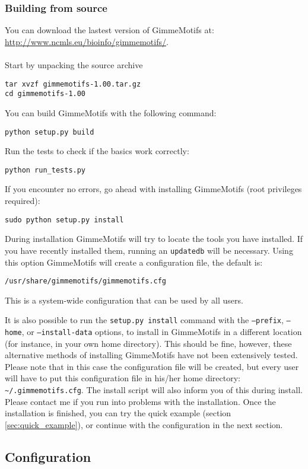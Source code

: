 \documentclass[11pt]{article}
\begin{document}
\subsubsection{Building from source}
You can download the lastest version of GimmeMotifs at:\\
\url{http://www.ncmls.eu/bioinfo/gimmemotifs/}. \\
\\
Start by unpacking the source archive
\begin{verbatim}
tar xvzf gimmemotifs-1.00.tar.gz
cd gimmemotifs-1.00
\end{verbatim}
You can build GimmeMotifs with the following command:
\begin{verbatim}
python setup.py build
\end{verbatim}
Run the tests to check if the basics work correctly:
\begin{verbatim}
python run_tests.py
\end{verbatim}
If you encounter no errors, go ahead with installing GimmeMotifs (root privileges required):
\begin{verbatim}
sudo python setup.py install
\end{verbatim}
During installation GimmeMotifs will try to locate the tools you have installed. If you have recently installed them, running an \texttt{updatedb} will be necessary. Using this option GimmeMotifs will create a configuration file, the default is:
\begin{verbatim}
/usr/share/gimmemotifs/gimmemotifs.cfg
\end{verbatim}
This is a system-wide configuration that can be used by all users.

It is also possible to run the \texttt{setup.py install} command with the \texttt{--prefix}, \texttt{--home}, or \texttt{--install-data} options, to install in GimmeMotifs in a different location (for instance, in your own home directory). This should be fine, however, these alternative methods of installing GimmeMotifs have not been extensively tested. Please note that in this case the configuration file will be created, but every user will have to put this configuration file in his/her home directory: \texttt{\textasciitilde{}/.gimmemotifs.cfg}. The install script will also inform you of this during install. Please contact me if you run into problems with the installation.
Once the installation is finished, you can try the quick example (section \ref{sec:quick_example}), or continue with the configuration in the next section.
\subsection{Configuration}
\label{sec:configuration}
\end{document}
